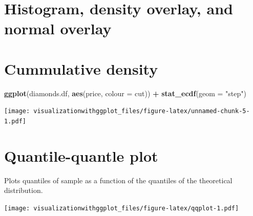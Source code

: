 \documentclass[]{krantz}
\makeatletter
\newenvironment{Shaded}{\begin{snugshade}}{\end{snugshade}}
\newcommand{\KeywordTok}[1]{\textcolor[rgb]{0.13,0.29,0.53}{\textbf{#1}}}
\newcommand{\DataTypeTok}[1]{\textcolor[rgb]{0.13,0.29,0.53}{#1}}
\newcommand{\StringTok}[1]{\textcolor[rgb]{0.31,0.60,0.02}{#1}}
\newcommand{\OperatorTok}[1]{\textcolor[rgb]{0.81,0.36,0.00}{\textbf{#1}}}
\newcommand{\NormalTok}[1]{#1}
\newenvironment{kframe}{%
\medskip{}
\setlength{\fboxsep}{.8em}
 \def\at@end@of@kframe{}%
 \ifinner\ifhmode%
  \def\at@end@of@kframe{\end{minipage}}%
  \begin{minipage}{\columnwidth}%
 \fi\fi%
 \def\FrameCommand##1{\hskip\@totalleftmargin \hskip-\fboxsep
 \colorbox{shadecolor}{##1}\hskip-\fboxsep
     \hskip-\linewidth \hskip-\@totalleftmargin \hskip\columnwidth}%
 \MakeFramed {\advance\hsize-\width
   \@totalleftmargin\z@ \linewidth\hsize
   \@setminipage}}%
 {\par\unskip\endMakeFramed%
 \at@end@of@kframe}
\renewenvironment{Shaded}{\begin{kframe}}{\end{kframe}}
\theoremstyle{definition}
\theoremstyle{definition}
\theoremstyle{definition}
\theoremstyle{remark}
\makeatother
\begin{document}
\section{Histogram, density overlay, and normal
overlay}\label{histogram-density-overlay-and-normal-overlay}

\section{Cummulative density}\label{cummulative-density}

\begin{Shaded}
\begin{Highlighting}[]
\KeywordTok{ggplot}\NormalTok{(diamonds.df, }\KeywordTok{aes}\NormalTok{(price, }\DataTypeTok{colour =}\NormalTok{ cut)) }\OperatorTok{+}\StringTok{ }
\StringTok{  }\KeywordTok{stat_ecdf}\NormalTok{(}\DataTypeTok{geom =} \StringTok{"step"}\NormalTok{)}
\end{Highlighting}
\end{Shaded}

\texttt{[image: visualizationwithggplot\_files/figure-latex/unnamed-chunk-5-1.pdf]}

\section{Quantile-quantle plot}\label{quantile-quantle-plot}

Plots quantiles of sample as a function of the quantiles of the
theoretical distribution.

\begin{Shaded}
\end{Shaded}

\texttt{[image: visualizationwithggplot\_files/figure-latex/qqplot-1.pdf]}
\end{document}
